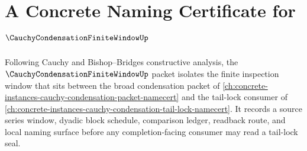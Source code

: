 \chapter{A Concrete Naming Certificate for $\CauchyCondensationFiniteWindowUp$}
\label{ch:concrete-instances-cauchy-condensation-finite-window-namecert}

Following Cauchy and Bishop--Bridges constructive analysis, the $\CauchyCondensationFiniteWindowUp$ packet isolates the finite inspection window that sits between the broad condensation packet of \autoref{ch:concrete-instances-cauchy-condensation-packet-namecert} and the tail-lock consumer of \autoref{ch:concrete-instances-cauchy-condensation-tail-lock-namecert}. It records a source series window, dyadic block schedule, comparison ledger, readback route, and local naming surface before any completion-facing consumer may read a tail-lock seal.

